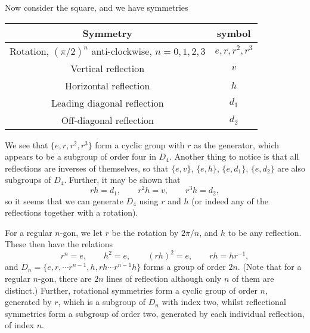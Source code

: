 \documentclass[letter-paper]{tufte-book}
\begin{document}
Now consider the square, and we have symmetries
\begin{table}[h]
  \begin{center}
  \begin{tabular}{c|c}
		Symmetry & symbol\\
		\hline
		Rotation, $(\pi/2)^n$ anti-clockwise, $n=0,1,2,3$ & $e,r,r^2,r^3$\\
		Vertical reflection & $v$\\
		Horizontal reflection & $h$\\
		Leading diagonal reflection & $d_1$\\
		Off-diagonal reflection & $d_2$
	\end{tabular}\end{center}
\end{table}
We see that $\{e,r,r^2,r^3\}$ form a cyclic group with $r$ as the generator,
which appears to be a subgroup of order four in $D_4$. Another thing to
notice is that all reflections are inverses of themselves, so that $\{e,v\}$,
$\{e,h\}$, $\{e,d_1\}$, $\{e,d_2\}$ are also subgroups of $D_4$. Further, it may 
be shown that
\begin{equation*}
  rh=d_1,\qquad r^2 h = v,\qquad r^3 h = d_2,
\end{equation*}
so it seems that we can generate $D_4$ using $r$ and $h$ (or indeed any of the 
reflections together with a rotation).

For a regular $n$-gon, we let $r$ be the rotation by $2\pi/n$, and $h$ to be any 
reflection. These then have the relations
\begin{equation*}
  r^n=e,\qquad h^2=e,\qquad (rh)^2=e,\qquad rh=hr^{-1},
\end{equation*}
and $D_n=\{e,r,\cdots r^{n-1},h,rh\cdots r^{n-1}h\}$ forms a group of order
$2n$. (Note that for a regular $n$-gon, there are $2n$ lines of reflection
although only $n$ of them are distinct.) Further, rotational symmetries form
a cyclic group of order $n$, generated by $r$, which is a subgroup of $D_n$
with index two, whilst reflectional symmetries form a subgroup of order two,
generated by each individual reflection, of index $n$.
\end{document}
